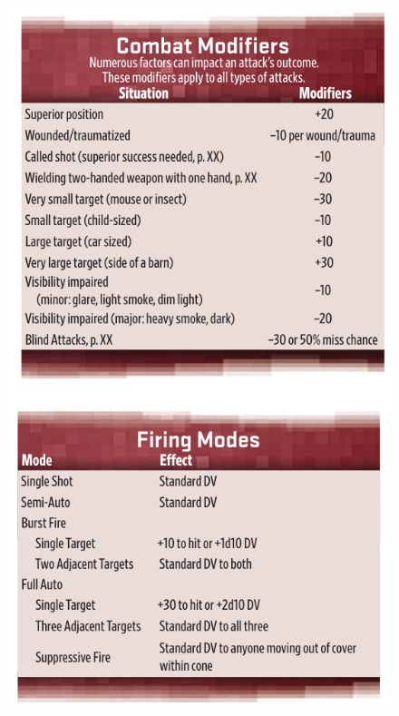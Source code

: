 \begin{figure}[htbp!]%
   \centering
   \includegraphics[scale=0.95]{gfx/combat-combined-fire-mod}%
\end{figure}%


